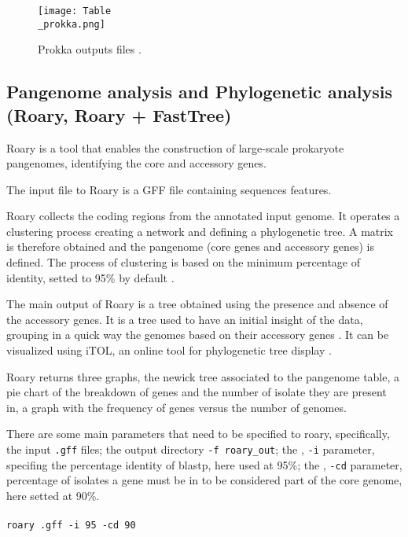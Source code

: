 \documentclass[a4paper,titlepage]{book}
\newcommand{\code}[1]{\colorbox{light-gray}{\texttt{#1}}}
\begin{document}
\begin{figure}[ht]
\centering
\texttt{[image: Table\\\_prokka.png]}
\caption{Prokka outputs files \cite{Prokka}.}
\label{fig:prokka-output}
\end{figure}

\subsection{Pangenome analysis and Phylogenetic analysis (Roary, Roary + FastTree)}

Roary is a tool that enables the construction of large-scale prokaryote pangenomes, identifying the core and accessory genes.

The input file to Roary is a GFF file containing sequences features. 

Roary collects the coding regions from the annotated input genome. It operates a clustering process creating a network and defining a phylogenetic tree. A matrix is therefore obtained and the pangenome (core genes and accessory genes) is defined.  The process of clustering is based on the minimum percentage of identity, setted to 95\% by default \cite{Roary}.

The main output of Roary is a tree obtained using the presence and absence of the accessory genes. It is a tree used to have an initial insight of the data, grouping in a quick way the genomes based on their accessory genes \cite{Roary}. It can be visualized using iTOL, an online tool for phylogenetic tree display \cite{iTOL}.

Roary returns three graphs, the newick tree associated to the pangenome table, a pie chart of the breakdown of genes and the number of isolate they are present in, a graph with the frequency of genes versus the number of genomes. \cite{Roary-outputs}


There are some main parameters that need to be specified to roary, specifically, the input \code{.gff} files; the output directory \code{-f roary\_out}; the , \code{-i} parameter, specifing the percentage identity of blastp, here used at 95\%; the , \code{-cd} parameter, percentage of isolates a gene must be in to be considered part of the core genome, here setted at 90\%.
\\ \newline \\ \code{roary .gff -i 95 -cd 90} \\ \newline \\
\end{document}
